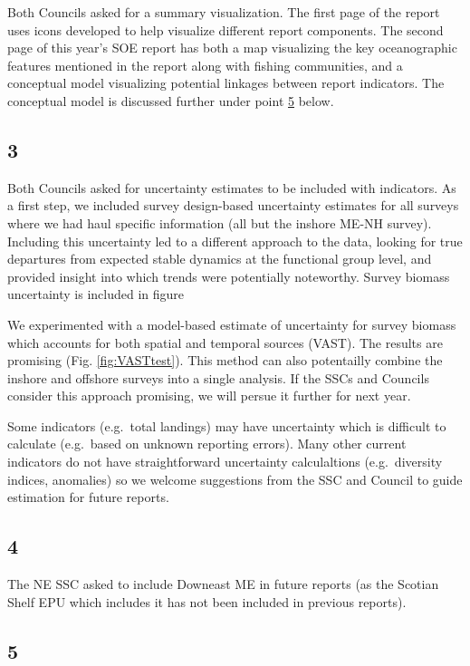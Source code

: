 \documentclass[10pt,]{article}
\begin{document}
Both Councils asked for a summary visualization. The first page of the
report uses icons developed to help visualize different report
components. The second page of this year's SOE report has both a map
visualizing the key oceanographic features mentioned in the report along
with fishing communities, and a conceptual model visualizing potential
linkages between report indicators. The conceptual model is discussed
further under point \protect\hyperlink{5}{5} below.

\hypertarget{section-2}{%
\subsection{3}\label{section-2}}

Both Councils asked for uncertainty estimates to be included with
indicators. As a first step, we included survey design-based uncertainty
estimates for all surveys where we had haul specific information (all
but the inshore ME-NH survey). Including this uncertainty led to a
different approach to the data, looking for true departures from
expected stable dynamics at the functional group level, and provided
insight into which trends were potentially noteworthy. Survey biomass
uncertainty is included in figure

We experimented with a model-based estimate of uncertainty for survey
biomass which accounts for both spatial and temporal sources (VAST). The
results are promising (Fig. \ref{fig:VASTtest}). This method can also
potentailly combine the inshore and offshore surveys into a single
analysis. If the SSCs and Councils consider this approach promising, we
will persue it further for next year.

Some indicators (e.g.~total landings) may have uncertainty which is
difficult to calculate (e.g.~based on unknown reporting errors). Many
other current indicators do not have straightforward uncertainty
calculaltions (e.g.~diversity indices, anomalies) so we welcome
suggestions from the SSC and Council to guide estimation for future
reports.

\hypertarget{section-3}{%
\subsection{4}\label{section-3}}

The NE SSC asked to include Downeast ME in future reports (as the
Scotian Shelf EPU which includes it has not been included in previous
reports).

\hypertarget{section-4}{%
\subsection{5}\label{section-4}}
\end{document}

